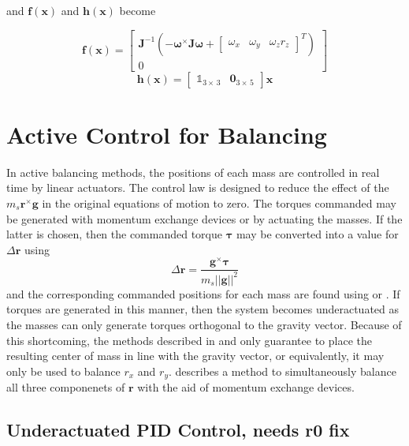 and $\bm{f}(\bm{x})$ and $\bm{h}(\bm{x})$ become

\begin{equation}
    \bm{f}(\bm{x}) = \begin{bmatrix}
        \bm{J}^{-1}(-\bm{\omega}^\times \bm{J\omega} + \begin{bmatrix} \omega_x & \omega_y & \omega_z r_z \end{bmatrix}^T)
        \\
        0
    \end{bmatrix}    
\end{equation}
\begin{equation}
    \bm{h}(\bm{x})= \begin{bmatrix}
        \mathbb{1}_{3\times\,3} & \bm{0}_{3\times\,5}
    \end{bmatrix}\bm{x}
\end{equation}


\section{Active Control for Balancing}

In active balancing methods, the positions of each mass are controlled in real time by linear actuators. The control law is designed to reduce the effect of the $m_s\bm{r}^{\times}\bm{g}$ in the original equations of motion to zero. The torques commanded may be generated with momentum exchange devices or by actuating the masses. If the latter is chosen, then the commanded torque $\bm{\tau}$ may be converted into a value for $\Delta\bm{r}$ using
\begin{equation}\label{equation:torque_to_del_r}
    \Delta\bm{r}=\frac{\bm{g}^{\times}\bm{\tau}}{m_s||\bm{g}||^2}
\end{equation}
and the corresponding commanded positions for each mass are found using  or . If torques are generated in this manner, then the system becomes underactuated as the masses can only generate torques orthogonal to the gravity vector. Because of this shortcoming, the methods described in  and  only guarantee to place the resulting center of mass in line with the gravity vector, or equivalently, it may only be used to balance $r_x$ and $r_y$.  describes a method to simultaneously balance all three componenets of $\bm{r}$ with the aid of momentum exchange devices. 

\subsection{Underactuated PID Control, needs r0 fix}\label{sec:under_PID}

